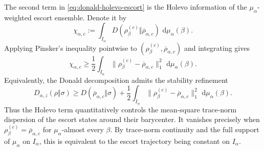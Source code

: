 \documentclass[12pt]{article}
\numberwithin{equation}{section}
\theoremstyle{definition}
\theoremstyle{remark}
\newcommand{\dd}{\,\mathrm d}
\newcommand{\?}{\overset{?}{=}}
\begin{document}
The second term in \eqref{eq:donald-holevo-escort} is the Holevo information of the
\(\mu_\alpha\)-weighted escort ensemble.  Denote it by
\begin{equation}
  \chi_{\alpha,c}
  :=
  \int_{I_\alpha}
    D(\rho_\beta^{(c)}
      \Vert\overline\rho_{\alpha,c})\,
    \dd\mu_\alpha(\beta).
  \label{eq:escort-holevo-information}
\end{equation}
Applying Pinsker's inequality pointwise to
\((\rho_\beta^{(c)},\overline\rho_{\alpha,c})\) and integrating gives
\begin{equation}
  \chi_{\alpha,c}
  \geq
  \frac12
  \int_{I_\alpha}
    \bigl\|
      \rho_\beta^{(c)}-\overline\rho_{\alpha,c}
    \bigr\|_1^2\,
    \dd\mu_\alpha(\beta).
  \label{eq:escort-holevo-pinsker}
\end{equation}
Equivalently, the Donald decomposition admits the stability refinement
\begin{equation}
  D_{\alpha,z}(\rho\Vert\sigma)
  \geq
  D(\overline\rho_{\alpha,c}\Vert\sigma)
  +
  \frac12
  \int_{I_\alpha}
    \bigl\|
      \rho_\beta^{(c)}-\overline\rho_{\alpha,c}
    \bigr\|_1^2\,
    \dd\mu_\alpha(\beta).
  \label{eq:donald-holevo-stability}
\end{equation}
Thus the Holevo term quantitatively controls the mean-square trace-norm
dispersion of the escort states around their barycenter.  It vanishes
precisely when
\(\rho_\beta^{(c)}=\overline\rho_{\alpha,c}\) for
\(\mu_\alpha\)-almost every \(\beta\).  By trace-norm continuity and the
full support of \(\mu_\alpha\) on \(I_\alpha\), this is equivalent to the
escort trajectory being constant on \(I_\alpha\).
\end{document}
